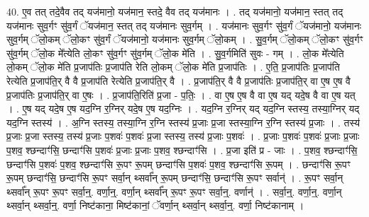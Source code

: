 \documentclass[17pt]{extarticle}
\begin{document}
40. ए॒व तत् तदे॒वैव तद् यज॑मानो॒ यज॑मान॒ स्तदे॒ वैव तद् यज॑मानः । . तद् यज॑मानो॒ यज॑मान॒ स्तत् तद् यज॑मानः सुव॒र्गꣳ सु॑व॒र्गं ॅयज॑मान॒ स्तत् तद् यज॑मानः सुव॒र्गम् । . यज॑मानः सुव॒र्गꣳ सु॑व॒र्गं ॅयज॑मानो॒ यज॑मानः सुव॒र्गम् ॅलो॒कम् ॅलो॒कꣳ सु॑व॒र्गं ॅयज॑मानो॒ यज॑मानः सुव॒र्गम् ॅलो॒कम् । . सु॒व॒र्गम् ॅलो॒कम् ॅलो॒कꣳ सु॑व॒र्गꣳ सु॑व॒र्गम् ॅलो॒क मे᳚त्येति लो॒कꣳ सु॑व॒र्गꣳ सु॑व॒र्गम् ॅलो॒क मे॑ति । . सु॒व॒र्गमिति॑ सुवः - गम् । . लो॒क मे᳚त्येति लो॒कम् ॅलो॒क मे॑ति प्र॒जाप॑तिः प्र॒जाप॑ति रेति लो॒कम् ॅलो॒क मे॑ति प्र॒जाप॑तिः । . ए॒ति॒ प्र॒जाप॑तिः प्र॒जाप॑ति रेत्येति प्र॒जाप॑ति॒र् वै वै प्र॒जाप॑ति रेत्येति प्र॒जाप॑ति॒र् वै । . प्र॒जाप॑ति॒र् वै वै प्र॒जाप॑तिः प्र॒जाप॑ति॒र् वा ए॒ष ए॒ष वै प्र॒जाप॑तिः प्र॒जाप॑ति॒र् वा ए॒षः । . प्र॒जाप॑ति॒रिति॑ प्र॒जा - प॒तिः॒ । . वा ए॒ष ए॒ष वै वा ए॒ष यद् यदे॒ष वै वा ए॒ष यत् । . ए॒ष यद् यदे॒ष ए॒ष यद॒ग्नि र॒ग्निर् यदे॒ष ए॒ष यद॒ग्निः । . यद॒ग्नि र॒ग्निर् यद् यद॒ग्नि स्तस्य॒ तस्या॒ग्निर् यद् यद॒ग्नि स्तस्य॑ । . अ॒ग्नि स्तस्य॒ तस्या॒ग्नि र॒ग्नि स्तस्य॑ प्र॒जाः प्र॒जा स्तस्या॒ग्नि र॒ग्नि स्तस्य॑ प्र॒जाः । . तस्य॑ प्र॒जाः प्र॒जा स्तस्य॒ तस्य॑ प्र॒जाः प॒शवः॑ प॒शवः॑ प्र॒जा स्तस्य॒ तस्य॑ प्र॒जाः प॒शवः॑ । . प्र॒जाः प॒शवः॑ प॒शवः॑ प्र॒जाः प्र॒जाः प॒शव॒ श्छन्दाꣳ॑सि॒ छन्दाꣳ॑सि प॒शवः॑ प्र॒जाः प्र॒जाः प॒शव॒ श्छन्दाꣳ॑सि । . प्र॒जा इति॑ प्र - जाः । . प॒शव॒ श्छन्दाꣳ॑सि॒ छन्दाꣳ॑सि प॒शवः॑ प॒शव॒ श्छन्दाꣳ॑सि रू॒पꣳ रू॒पम् छन्दाꣳ॑सि प॒शवः॑ प॒शव॒ श्छन्दाꣳ॑सि रू॒पम् । . छन्दाꣳ॑सि रू॒पꣳ रू॒पम् छन्दाꣳ॑सि॒ छन्दाꣳ॑सि रू॒पꣳ सर्वा॒न् थ्सर्वा᳚न् रू॒पम् छन्दाꣳ॑सि॒ छन्दाꣳ॑सि रू॒पꣳ सर्वान्॑ । . रू॒पꣳ सर्वा॒न् थ्सर्वा᳚न् रू॒पꣳ रू॒पꣳ सर्वा॒न्॒. वर्णा॒न्॒. वर्णा॒न् थ्सर्वा᳚न् रू॒पꣳ रू॒पꣳ सर्वा॒न्॒. वर्णान्॑ । . सर्वा॒न्॒. वर्णा॒न्॒. वर्णा॒न् थ्सर्वा॒न् थ्सर्वा॒न्॒. वर्णा॒ निष्ट॑काना॒ मिष्ट॑कानां॒ ॅवर्णा॒न् थ्सर्वा॒न् थ्सर्वा॒न्॒. वर्णा॒ निष्ट॑कानाम् । \newline
\end{document}
